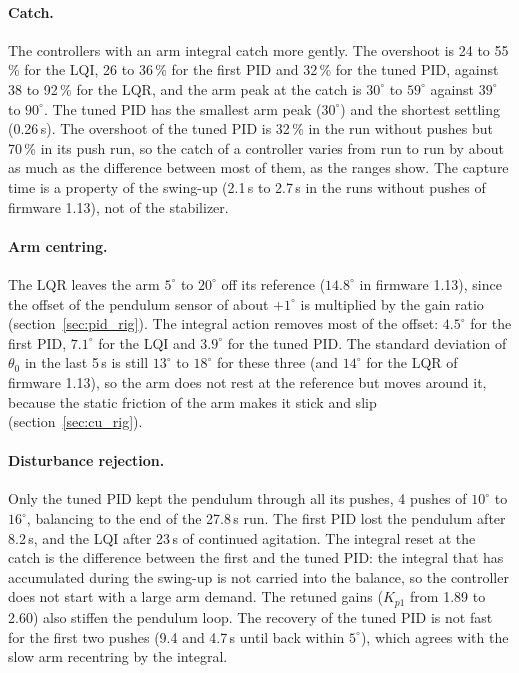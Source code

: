 \documentclass[a4paper,11pt]{article}
\begin{document}
\paragraph{Catch.} The controllers with an arm integral catch more gently. The overshoot is 24 to 55\,\% for the LQI, 26 to 36\,\% for the first PID and 32\,\% for the tuned PID, against 38 to 92\,\% for the LQR, and the arm peak at the catch is $30^\circ$ to $59^\circ$ against $39^\circ$ to $90^\circ$. The tuned PID has the smallest arm peak ($30^\circ$) and the shortest settling (0.26\,s). The overshoot of the tuned PID is 32\,\% in the run without pushes but 70\,\% in its push run, so the catch of a controller varies from run to run by about as much as the difference between most of them, as the ranges show. The capture time is a property of the swing-up (2.1\,s to 2.7\,s in the runs without pushes of firmware 1.13), not of the stabilizer.

\paragraph{Arm centring.} The LQR leaves the arm $5^\circ$ to $20^\circ$ off its reference ($14.8^\circ$ in firmware 1.13), since the offset of the pendulum sensor of about $+1^\circ$ is multiplied by the gain ratio (section~\ref{sec:pid_rig}). The integral action removes most of the offset: $4.5^\circ$ for the first PID, $7.1^\circ$ for the LQI and $3.9^\circ$ for the tuned PID. The standard deviation of $\theta_0$ in the last 5\,s is still $13^\circ$ to $18^\circ$ for these three (and $14^\circ$ for the LQR of firmware 1.13), so the arm does not rest at the reference but moves around it, because the static friction of the arm makes it stick and slip (section~\ref{sec:cu_rig}).

\paragraph{Disturbance rejection.} Only the tuned PID kept the pendulum through all its pushes, 4 pushes of $10^\circ$ to $16^\circ$, balancing to the end of the 27.8\,s run. The first PID lost the pendulum after 8.2\,s, and the LQI after 23\,s of continued agitation. The integral reset at the catch is the difference between the first and the tuned PID: the integral that has accumulated during the swing-up is not carried into the balance, so the controller does not start with a large arm demand. The retuned gains ($K_{p1}$ from 1.89 to 2.60) also stiffen the pendulum loop. The recovery of the tuned PID is not fast for the first two pushes (9.4 and 4.7\,s until back within $5^\circ$), which agrees with the slow arm recentring by the integral.
\end{document}
